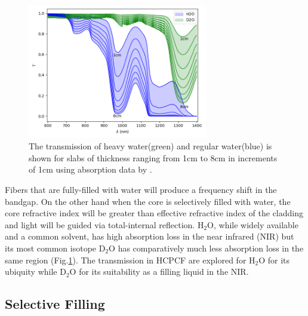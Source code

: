\begin{figure}[!htb]
	\centering
	\includegraphics[width=0.7\textwidth]{./Figures/fiberfilling/water_transmission/water_transmission.png}
	\caption{The transmission of heavy water(green) and regular water(blue) is shown for slabs of thickness ranging from 1cm to 8cm in increments of 1cm using absorption data by \cite{kedenburg}. }
	\label{fig:water transmission}
\end{figure}
Fibers that are fully-filled with water will produce a frequency shift in the bandgap. On the other hand when the core is selectively filled with water, the core refractive index will be greater than effective refractive index of the cladding and light will be guided via total-internal reflection. H${}_2$O, while widely available and a common solvent, has high absorption loss in the near infrared (NIR) but its most common isotope D${}_2$O has comparatively much less absorption loss in the same region (Fig.\ref{fig:water transmission}). The transmission in HCPCF are explored for H${}_2$O for its ubiquity while D${}_2$O for its suitability as a filling liquid in the NIR.
\clearpage
\subsection{Selective Filling}
